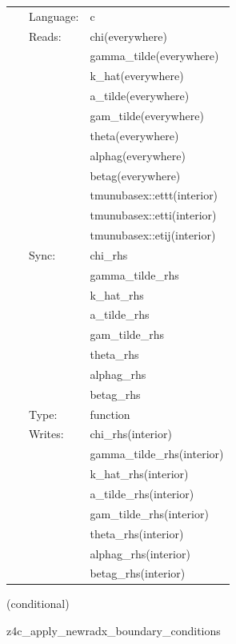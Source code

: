  \begin{tabular*}{160mm}{cll} 
~ & Language:  & c \\ 
~ & Reads:  & chi(everywhere) \\ 
~& ~ &gamma\_tilde(everywhere)\\ 
~& ~ &k\_hat(everywhere)\\ 
~& ~ &a\_tilde(everywhere)\\ 
~& ~ &gam\_tilde(everywhere)\\ 
~& ~ &theta(everywhere)\\ 
~& ~ &alphag(everywhere)\\ 
~& ~ &betag(everywhere)\\ 
~& ~ &tmunubasex::ettt(interior)\\ 
~& ~ &tmunubasex::etti(interior)\\ 
~& ~ &tmunubasex::etij(interior)\\ 
~ & Sync:  & chi\_rhs \\ 
~& ~ &gamma\_tilde\_rhs\\ 
~& ~ &k\_hat\_rhs\\ 
~& ~ &a\_tilde\_rhs\\ 
~& ~ &gam\_tilde\_rhs\\ 
~& ~ &theta\_rhs\\ 
~& ~ &alphag\_rhs\\ 
~& ~ &betag\_rhs\\ 
~ & Type:  & function \\ 
~ & Writes:  & chi\_rhs(interior) \\ 
~& ~ &gamma\_tilde\_rhs(interior)\\ 
~& ~ &k\_hat\_rhs(interior)\\ 
~& ~ &a\_tilde\_rhs(interior)\\ 
~& ~ &gam\_tilde\_rhs(interior)\\ 
~& ~ &theta\_rhs(interior)\\ 
~& ~ &alphag\_rhs(interior)\\ 
~& ~ &betag\_rhs(interior)\\ 
\end{tabular*} 


\vspace{5mm}

   (conditional) 

\hspace{5mm} z4c\_apply\_newradx\_boundary\_conditions 

\hspace{5mm}{\it apply radiative boundary conditions to z4c rhs variables using newradx } 


